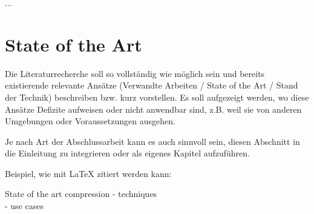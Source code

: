 ...

\section{State of the Art}
\label{ch:Grundlagen:sec:SOTA}
Die Literaturrecherche soll so vollständig wie möglich sein und bereits existierende relevante Ansätze (Verwandte Arbeiten / State of the Art / Stand der Technik) beschreiben bzw. kurz vorstellen.
Es soll aufgezeigt werden, wo diese Ansätze Defizite aufweisen oder nicht anwendbar sind, z.B. weil sie von anderen Umgebungen oder Voraussetzungen ausgehen.

Je nach Art der Abschlussarbeit kann es auch sinnvoll sein, diesen Abschnitt in die Einleitung zu integrieren oder als eigenes Kapitel aufzuführen.

Beispiel, wie mit LaTeX zitiert werden kann: \cite{TB98,JSAC96,qosr}


State of the art compression
- techniques\\
- use cases\\


